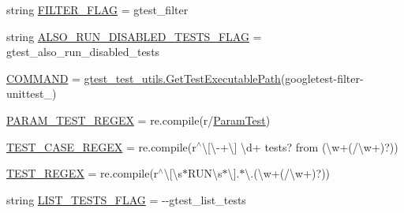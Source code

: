 \begin{DoxyCompactItemize}
\item 
string \mbox{\hyperlink{namespacegoogletest-master_1_1googletest_1_1test_1_1googletest-filter-unittest_abb330fe7ab74db46643c00e74a359079}{F\+I\+L\+T\+E\+R\+\_\+\+F\+L\+AG}} = \textquotesingle{}gtest\+\_\+filter\textquotesingle{}
\item 
string \mbox{\hyperlink{namespacegoogletest-master_1_1googletest_1_1test_1_1googletest-filter-unittest_a6bd12f84b7736a783a11d13a5d425980}{A\+L\+S\+O\+\_\+\+R\+U\+N\+\_\+\+D\+I\+S\+A\+B\+L\+E\+D\+\_\+\+T\+E\+S\+T\+S\+\_\+\+F\+L\+AG}} = \textquotesingle{}gtest\+\_\+also\+\_\+run\+\_\+disabled\+\_\+tests\textquotesingle{}
\item 
\mbox{\hyperlink{namespacegoogletest-master_1_1googletest_1_1test_1_1googletest-filter-unittest_ac9558807dd67dd53c89cc7e34ebd1146}{C\+O\+M\+M\+A\+ND}} = \mbox{\hyperlink{namespacegoogletest-master_1_1googletest_1_1test_1_1gtest__test__utils_a78bbc69ac699e750a6a29188caa643c4}{gtest\+\_\+test\+\_\+utils.\+Get\+Test\+Executable\+Path}}(\textquotesingle{}googletest-\/filter-\/unittest\+\_\+\textquotesingle{})
\item 
\mbox{\hyperlink{namespacegoogletest-master_1_1googletest_1_1test_1_1googletest-filter-unittest_a6db5eac02072ec2b17469418f03ab65b}{P\+A\+R\+A\+M\+\_\+\+T\+E\+S\+T\+\_\+\+R\+E\+G\+EX}} = re.\+compile(r\textquotesingle{}/\mbox{\hyperlink{class_param_test}{Param\+Test}}\textquotesingle{})
\item 
\mbox{\hyperlink{namespacegoogletest-master_1_1googletest_1_1test_1_1googletest-filter-unittest_a15ee3c2dee9b441e40d77cda30faac51}{T\+E\+S\+T\+\_\+\+C\+A\+S\+E\+\_\+\+R\+E\+G\+EX}} = re.\+compile(r\textquotesingle{}$^\wedge$\textbackslash{}\mbox{[}\textbackslash{}-\/+\textbackslash{}\mbox{]} \textbackslash{}d+ tests? from (\textbackslash{}w+(/\textbackslash{}w+)?)\textquotesingle{})
\item 
\mbox{\hyperlink{namespacegoogletest-master_1_1googletest_1_1test_1_1googletest-filter-unittest_afae3d624b711bb171ab37cf2ae206ccc}{T\+E\+S\+T\+\_\+\+R\+E\+G\+EX}} = re.\+compile(r\textquotesingle{}$^\wedge$\textbackslash{}\mbox{[}\textbackslash{}s$\ast$R\+U\+N\textbackslash{}s$\ast$\textbackslash{}\mbox{]}.$\ast$\textbackslash{}.(\textbackslash{}w+(/\textbackslash{}w+)?)\textquotesingle{})
\item 
string \mbox{\hyperlink{namespacegoogletest-master_1_1googletest_1_1test_1_1googletest-filter-unittest_abca567a79ea0368ba10161b0cd426cab}{L\+I\+S\+T\+\_\+\+T\+E\+S\+T\+S\+\_\+\+F\+L\+AG}} = \textquotesingle{}-\/-\/gtest\+\_\+list\+\_\+tests\textquotesingle{}

\end{DoxyCompactItemize}
